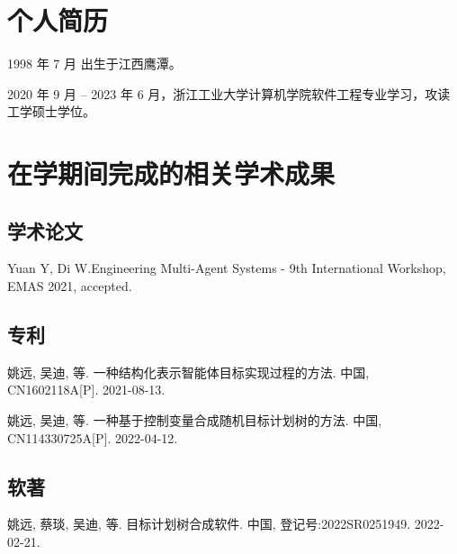 
\begin{resume}

  \section*{个人简历}

  1998 年 7 月 出生于江西鹰潭。

  2020 年 9 月 -- 2023 年 6 月，浙江工业大学计算机学院软件工程专业学习，攻读工学硕士学位。


  \section*{在学期间完成的相关学术成果}

  \subsection*{学术论文}

  \begin{achievements}
    \item Yuan Y, Di W.Engineering Multi-Agent Systems - 9th International Workshop, {EMAS}
    2021, accepted.
  \end{achievements}


  \subsection*{专利}

  \begin{achievements}
    \item 姚远, 吴迪, 等. 一种结构化表示智能体目标实现过程的方法. 中国, CN1602118A[P]. 2021-08-13.
    \item 姚远, 吴迪, 等. 一种基于控制变量合成随机目标计划树的方法. 中国, CN114330725A[P]. 2022-04-12.
  \end{achievements}

  \subsection*{软著}
  \begin{achievements}
  \item 姚远, 蔡琰, 吴迪, 等. 目标计划树合成软件. 中国, 登记号:2022SR0251949. 2022-02-21.
  \end{achievements}

\end{resume}
